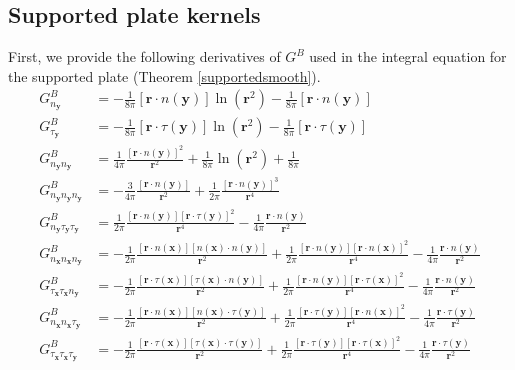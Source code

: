 \documentclass[preprint,12pt,3p]{elsarticle}
\begin{document}
\subsection{Supported plate kernels} \label{appsupported}
First, we provide the following derivatives of $G^{B}$ used in the integral equation for the supported plate (Theorem \ref{supportedsmooth}).
\begin{align}
        G^{B}_{n_\mathbf{y} } &= - \frac{1}{8\pi} [\pmb{r} \cdot n(\mathbf{y})] \ln(\pmb{r}^2) -  \frac{1}{8\pi} [\pmb{r} \cdot n(\mathbf{y})]    \\
        G^{B}_{\tau_\mathbf{y} } &= - \frac{1}{8\pi} [\pmb{r} \cdot \tau(\mathbf{y})] \ln(\pmb{r}^2) -  \frac{1}{8\pi} [\pmb{r} \cdot \tau(\mathbf{y})]    \\
        G^{B}_{n_\mathbf{y} n_\mathbf{y}} &= \frac{1}{4\pi} \frac{[\pmb{r}\cdot  n(\mathbf{y}) ]^2}{\pmb{r}^2} + \frac{1}{8\pi}\ln(\pmb{r}^2) + \frac{1}{8\pi} \\
    G^{B}_{n_\mathbf{y} n_\mathbf{y} n_\mathbf{y}} &= -\frac{3}{4\pi} \frac{[\pmb{r}\cdot n(\mathbf{y})]}{\pmb{r}^2} + \frac{1}{2\pi} \frac{[\pmb{r}\cdot n(\mathbf{y})]^3}{\pmb{r}^4} \\
    G^{B}_{ n_\mathbf{y} \tau_\mathbf{y} \tau_\mathbf{y}} &=  \frac{1}{2\pi} \frac{[\pmb{r}\cdot  n(\mathbf{y}) ][\pmb{r}\cdot \tau(\mathbf{y})]^2}{\pmb{r}^4} -\frac{1}{4\pi}\frac{\pmb{r}\cdot  n(\mathbf{y}) }{\pmb{r}^2} \\
  G^{B}_{n_\mathbf{x} n_\mathbf{x} n_\mathbf{y}} &= -\frac{1}{2\pi} \frac{[\pmb{r}\cdot n(\mathbf{x})][n(\mathbf{x}) \cdot  n(\mathbf{y}) ]}{\pmb{r}^2} + \frac{1}{2\pi} \frac{[\pmb{r}\cdot  n(\mathbf{y}) ][\pmb{r}\cdot n(\mathbf{x})]^2}{\pmb{r}^4} -\frac{1}{4\pi}\frac{\pmb{r}\cdot  n(\mathbf{y}) }{\pmb{r}^2}\\
    G^{B}_{\tau_\mathbf{x} \tau_\mathbf{x} n_\mathbf{y}} &= -\frac{1}{2\pi} \frac{[\pmb{r}\cdot \tau(\mathbf{x})][\tau(\mathbf{x}) \cdot  n(\mathbf{y}) ]}{\pmb{r}^2} + \frac{1}{2\pi} \frac{[\pmb{r}\cdot  n(\mathbf{y}) ][\pmb{r}\cdot \tau(\mathbf{x})]^2}{\pmb{r}^4} -\frac{1}{4\pi}\frac{\pmb{r}\cdot  n(\mathbf{y}) }{\pmb{r}^2}\\
    G^{B}_{n_\mathbf{x} n_\mathbf{x} \tau_\mathbf{y}} &= -\frac{1}{2\pi} \frac{[\pmb{r}\cdot  n(\mathbf{x}) ][ n(\mathbf{x})  \cdot  \tau(\mathbf{y}) ]}{\pmb{r}^2} + \frac{1}{2\pi} \frac{[\pmb{r}\cdot  \tau(\mathbf{y}) ][\pmb{r}\cdot  n(\mathbf{x}) ]^2}{\pmb{r}^4} -\frac{1}{4\pi}\frac{\pmb{r}\cdot  \tau(\mathbf{y}) }{\pmb{r}^2}\\
     G^{B}_{\tau_\mathbf{x} \tau_\mathbf{x} \tau_\mathbf{y}} &= -\frac{1}{2\pi} \frac{[\pmb{r}\cdot \tau(\mathbf{x})][\tau(\mathbf{x}) \cdot  \tau(\mathbf{y}) ]}{\pmb{r}^2} + \frac{1}{2\pi} \frac{[\pmb{r}\cdot  \tau(\mathbf{y}) ][\pmb{r}\cdot \tau(\mathbf{x})]^2}{\pmb{r}^4} -\frac{1}{4\pi}\frac{\pmb{r}\cdot  \tau(\mathbf{y}) }{\pmb{r}^2}\\

\end{align}
\end{document}
